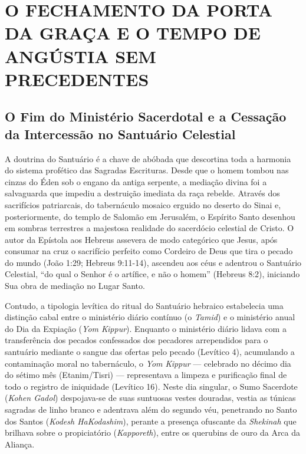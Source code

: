\documentclass[11pt,a4paper,openany]{book}
\begin{document}
\section{O FECHAMENTO DA PORTA DA GRAÇA E O TEMPO DE ANGÚSTIA SEM PRECEDENTES}



\subsection{O Fim do Ministério Sacerdotal e a Cessação da Intercessão no Santuário Celestial}


A doutrina do Santuário é a chave de abóbada que descortina toda a harmonia do sistema profético das Sagradas Escrituras. Desde que o homem tombou nas cinzas do Éden sob o engano da antiga serpente, a mediação divina foi a salvaguarda que impediu a destruição imediata da raça rebelde. Através dos sacrifícios patriarcais, do tabernáculo mosaico erguido no deserto do Sinai e, posteriormente, do templo de Salomão em Jerusalém, o Espírito Santo desenhou em sombras terrestres a majestosa realidade do sacerdócio celestial de Cristo. O autor da Epístola aos Hebreus assevera de modo categórico que Jesus, após consumar na cruz o sacrifício perfeito como Cordeiro de Deus que tira o pecado do mundo (João 1:29; Hebreus 9:11-14), ascendeu aos céus e adentrou o Santuário Celestial, ``do qual o Senhor é o artífice, e não o homem'' (Hebreus 8:2), iniciando Sua obra de mediação no Lugar Santo.

Contudo, a tipologia levítica do ritual do Santuário hebraico estabelecia uma distinção cabal entre o ministério diário contínuo (o \textit{Tamid}) e o ministério anual do Dia da Expiação (\textit{Yom Kippur}). Enquanto o ministério diário lidava com a transferência dos pecados confessados dos pecadores arrependidos para o santuário mediante o sangue das ofertas pelo pecado (Levítico 4), acumulando a contaminação moral no tabernáculo, o \textit{Yom Kippur} — celebrado no décimo dia do sétimo mês (Etanim/Tisri) — representava a limpeza e purificação final de todo o registro de iniquidade (Levítico 16). Neste dia singular, o Sumo Sacerdote (\textit{Kohen Gadol}) despojava-se de suas suntuosas vestes douradas, vestia as túnicas sagradas de linho branco e adentrava além do segundo véu, penetrando no Santo dos Santos (\textit{Kodesh HaKodashim}), perante a presença ofuscante da \textit{Shekinah} que brilhava sobre o propiciatório (\textit{Kapporeth}), entre os querubins de ouro da Arca da Aliança.
\end{document}
